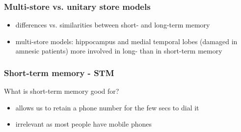 \documentclass[]{beamer}
\begin{document}
\begin{frame}
 \frametitle{Multi-store vs. unitary store models}
\begin{overlayarea}{120mm}{90mm}
\begin{itemize}
 \item differences vs. similarities between short- and long-term memory
 \item multi-store models: hippocampus and medial temporal lobes (damaged in amnesic patients) more involved in long- than in short-term memory
\end{itemize}

\end{overlayarea}
\end{frame}


\begin{frame}
 \frametitle{Short-term memory - STM}
\begin{center}
 What is short-term memory good for?
\end{center}
\begin{itemize}
 \item<2-> allows us to retain a phone number for the few secs to dial it
 \item<3-> irrelevant as most people have mobile phones
\end{itemize}
\end{frame}
\end{document}

